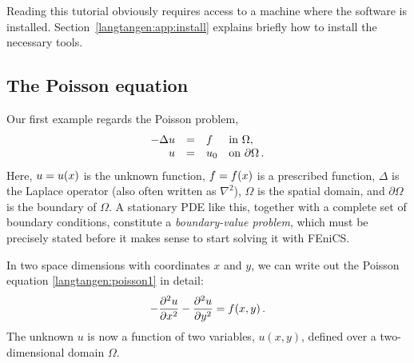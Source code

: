 
Reading this tutorial obviously requires access to a machine where the
\fenics{} software is installed. Section~\ref{langtangen:app:install}
explains briefly how to install the necessary tools.

\subsection{The Poisson equation}
\label{langtangen:poisson1:bvp}

Our first example regards the Poisson problem,
\begin{equation} \label{langtangen:poisson1}
  \begin{array}{rcll}
    - \Delta u &=& f &\mbox{in } \Omega, \\
    u &=& u_0 &\mbox{on } \partial \Omega\thinspace .
  \end{array}
\end{equation}
Here, $u = u({x})$ is the unknown function,
$f = f({x})$ is a prescribed function, $\Delta$ is
the Laplace operator (also often written as $\nabla^2$), $\Omega$ is
the spatial domain, and $\partial\Omega$ is the boundary of
$\Omega$. A stationary PDE like this, together with a complete set of
boundary conditions, constitute a \emph{boundary-value problem}, which
must be precisely stated before it makes sense to start solving it
with FEniCS.

In two space dimensions
with coordinates $x$ and $y$, we can write out the Poisson equation
\eqref{langtangen:poisson1}
in detail:
\begin{equation}
- \frac{\partial^2 u}{\partial x^2}
- \frac{\partial^2 u}{\partial y^2} = f(x,y)\thinspace .
\end{equation}
The unknown $u$ is now a function of two variables, $u(x,y)$, defined
over a two-dimensional domain $\Omega$.

